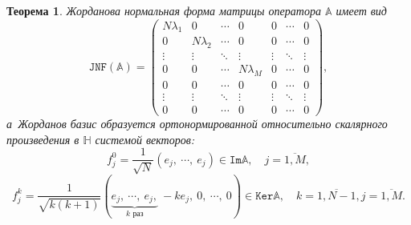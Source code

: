 \documentclass[a4paper]{article}
\newtheorem{thm}{Теорема}
\begin{document}
 \begin{thm}
     Жорданова нормальная форма матрицы оператора \( \mathbb{A} \)
     имеет вид
     \begin{equation}\label{eq:ideal:jnf}
         \mathtt{JNF}(\mathbb{A})=
         \left(\begin{array}{cccc|ccc}
             N\lambda_1 & 0  & \cdots & 0 & 0 & \cdots & 0 \\
             0 & N\lambda_2  & \cdots & 0 & 0 & \cdots & 0 \\
             \vdots & \vdots & \ddots & \vdots & \vdots & \ddots & \vdots \\
             0 & 0 & \cdots  & N\lambda_M & 0 & \cdots & 0 \\
             \hline
             0 & 0 & \cdots  & 0 & 0 & \cdots & 0 \\
             \vdots & \vdots & \ddots & \vdots & \vdots & \ddots & \vdots \\
             0 & 0 & \cdots  & 0 & 0 & \cdots & 0
        \end{array}\right),
     \end{equation}
     а~Жорданов базис образуется ортонормированной относительно скалярного произведения в \( \mathbb{H} \) системой векторов:
     \begin{equation}\label{eq:ideal:jbasis-im}
         f_j^0 = \frac{1}{\sqrt{N}}\left( e_j,~\cdots,~e_j\right)\in\mathtt{Im}\mathbb{A},\quad
     j=\overline{1,M}, \end{equation}
     \begin{equation}\label{eq:ideal:jbasis-ker}
         f_j^k = \frac{1}{\sqrt{k(k+1)}}
                ({
                    \underbrace{e_j, ~ \cdots, ~ e_j,}_{ k \text{ раз}} ~ -ke_j, ~ 0, ~ \cdots, ~ 0
                    })
                    \in\mathtt{Ker}\mathbb{A},
                    \quad k=\overline{1,N-1},j=\overline{1,M}
     .\end{equation} %
 \end{thm}
\end{document}

